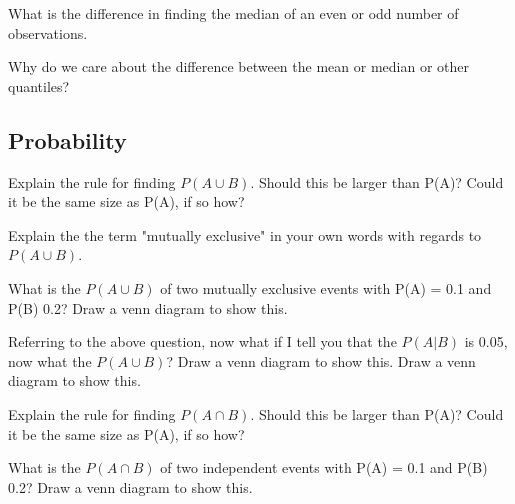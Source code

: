 \documentclass[11pt]{article}
\begin{document}
What is the difference in finding the median of an even or odd number of observations.
\newline 
\newline
\newline 


Why do we care about the difference between the mean or median or other quantiles? 
\newline 
\newline
\newline 


\subsection{Probability}


Explain the rule for finding $P(A \cup B)$. Should this be larger than P(A)? Could it be the same size as P(A), if so how? 
\newline  
\newline
\newline 



Explain the the term "mutually exclusive" in your own words with regards to $P(A \cup B)$. 
\newline 
\newline
\newline 

What is the $P(A \cup B)$ of two mutually exclusive events with P(A) = 0.1 and P(B) 0.2? Draw a venn diagram to show this. 
\newline 
\newline
\newline 

Referring to the above question, now what if I tell you that the $P(A|B)$ is 0.05, now what the $P(A \cup B)$?  Draw a venn diagram to show this. Draw a venn diagram to show this. 
\newline 
\newline
\newline 



Explain the rule for finding $P(A \cap B)$. Should this be larger than P(A)? Could it be the same size as P(A), if so how? 
\newline  
\newline
\newline 


What is the $P(A \cap B)$ of two independent events with P(A) = 0.1 and P(B) 0.2? Draw a venn diagram to show this. 
\newline 
\newline
\newline 
\end{document}
